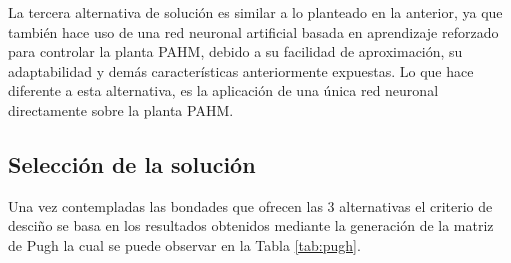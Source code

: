 \documentclass[12pt]{article}
\begin{document}
La tercera alternativa de solución es similar a lo planteado en la anterior, ya que también hace uso de una red neuronal artificial basada en aprendizaje reforzado para controlar la planta PAHM, debido a su facilidad de aproximación, su adaptabilidad y demás características anteriormente expuestas. Lo que hace diferente a esta alternativa, es la aplicación de una única red neuronal directamente sobre la planta PAHM\cite{15_tec}.

\subsection{Selección de la solución}

Una vez contempladas las bondades que ofrecen las 3 alternativas el criterio de desciño se basa en los resultados obtenidos mediante la generación de la matriz de Pugh la cual se puede observar en la Tabla \ref{tab:pugh}.
\end{document}
